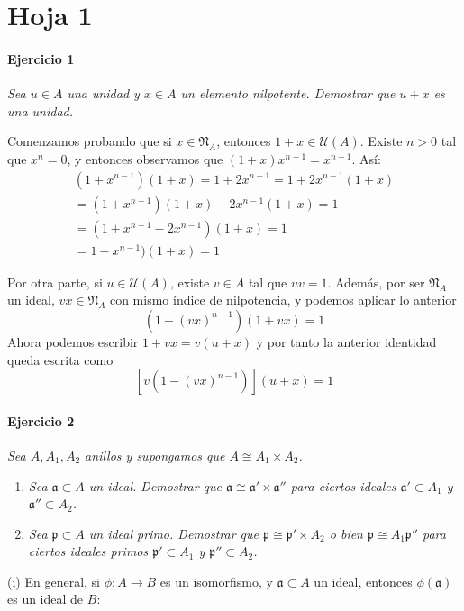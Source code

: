 \documentclass[../main.tex]{subfiles}
\begin{document}
\section{Hoja 1}

\paragraph{Ejercicio 1} \textit{Sea $u\in A$ una unidad y $x\in A$ un elemento nilpotente. Demostrar que $u+x$ es una unidad.}

Comenzamos probando que si $x\in \mathfrak N_A$, entonces $1+x\in \mathcal U(A)$. Existe $n>0$ tal que $x^n=0$, y entonces observamos que $(1+x)x^{n-1}=x^{n-1}$. Así:
\begin{multline}
(1+x^{n-1})(1+x) = 1+2x^{n-1} =1+2x^{n-1}(1+x)\\
=(1+x^{n-1})(1+x)-2x^{n-1}(1+x)=1\\
=(1+x^{n-1}-2x^{n-1})(1+x)=1\\
=1-x^{n-1})(1+x)=1
\end{multline}

Por otra parte, si $u\in \mathcal U(A)$, existe $v\in A$ tal que $uv=1$. Además, por ser $\mathfrak N_A$ un ideal, $vx \in \mathfrak N_A$ con mismo índice de nilpotencia, y podemos aplicar lo anterior
$$
(1-(vx)^{n-1})(1+vx)=1
$$
Ahora podemos escribir $1+vx = v(u+x)$ y por tanto la anterior identidad queda escrita como
$$
[v(1-(vx)^{n-1})](u+x)=1
$$


\paragraph{Ejercicio 2} \textit{Sea $A,A_1,A_2$ anillos y supongamos que $A\cong A_1\times A_2$.}
\begin{enumerate}[label=(\roman*)]
    \item \textit{Sea $\mathfrak a \subset A$ un ideal. Demostrar que $\mathfrak a \cong \mathfrak a' \times \mathfrak a''$ para ciertos ideales $\mathfrak a' \subset A_1$ y $\mathfrak a'' \subset A_2$.}
    \item \textit{Sea $\mathfrak p \subset A$ un ideal primo. Demostrar que $\mathfrak p \cong \mathfrak  p' \times A_2$ o bien $\mathfrak p \cong A_1 \mathfrak p''$ para ciertos ideales primos $\mathfrak p' \subset A_1$ y $\mathfrak p'' \subset A_2$.}
\end{enumerate}

(i) En general, si $\phi:A\to B$ es un isomorfismo, y $\mathfrak a \subset A$ un ideal, entonces $\phi(\mathfrak a)$ es un ideal de $B$:
\end{document}
